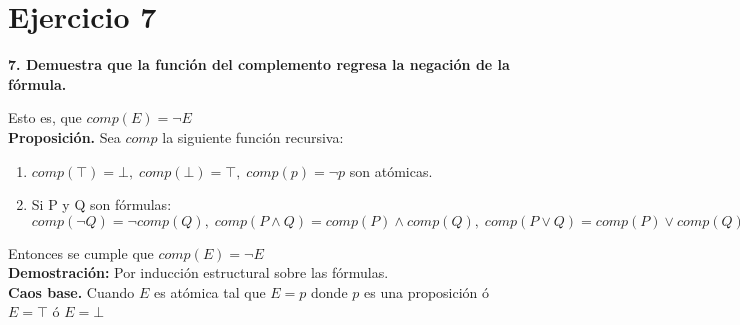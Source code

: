 \chapter*{Ejercicio 7}
\textbf{7. Demuestra que la función del complemento regresa la negación de la fórmula.}

Esto es, que $comp(E)=\neg E$\\
\textbf{Proposición.} Sea $comp$ la siguiente función recursiva:
\begin{enumerate}
	\item $comp(\top) = \bot,\;comp(\bot) = \top,\;comp(p) = \neg p$ son atómicas.
	\item Si P y Q son fórmulas: $comp(\neg Q) = \neg comp(Q),\;comp(P \land Q) = comp(P) \land comp(Q),\;comp(P \lor Q) = comp(P)\lor comp(Q)$
\end{enumerate}
\indent Entonces se cumple que $comp(E)=\neg E$
\noindent\\
\textbf{Demostración:} Por inducción estructural sobre las fórmulas.\\
\indent
\textbf{Caos base.} Cuando $E$ es atómica tal que $E=p$ donde $p$ es una proposición ó $E=\top$ ó $E=\bot$
